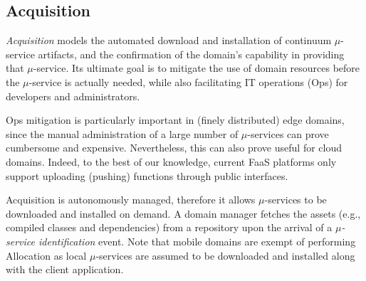 


\subsection{Acquisition}\label{sec:A3-E-acquisition}

\textit{Acquisition} models the automated download and installation of continuum $\mu$-service artifacts, and the confirmation of the domain's capability in providing that $\mu$-service. Its ultimate goal is to mitigate the use of domain resources before the $\mu$-service is actually needed, while also facilitating IT operations (Ops) for developers and administrators. 

Ops mitigation is particularly important in (finely distributed) edge domains, since the manual administration of a large number of $\mu$-services can prove cumbersome and expensive. Nevertheless, this can also prove useful for cloud domains. Indeed, to the best of our knowledge, current FaaS platforms only support uploading (pushing) functions through public interfaces. 

Acquisition is autonomously managed, therefore it allows $\mu$-services to be downloaded 
and installed on demand. A domain manager fetches the assets (e.g., compiled classes and dependencies) from a repository upon the arrival of a \textit{$\mu$-service identification} event. Note that mobile domains are exempt of performing Allocation as local $\mu$-services are assumed to be downloaded and installed along with the client application.

